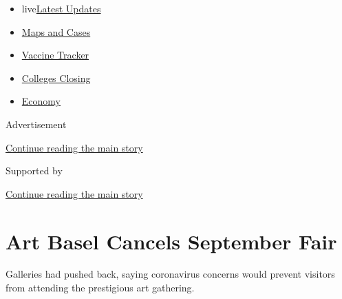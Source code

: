 \begin{itemize}
\tightlist
\item
  live\href{https://www.nytimes3xbfgragh.onion/2020/08/20/world/coronavirus-covid.html?name=styln-coronavirus-national\&region=TOP_BANNER\&variant=undefined\&block=storyline_menu_recirc\&action=click\&pgtype=Article\&impression_id=d84450a1-e386-11ea-ba8c-a97e9a30926c}{Latest
  Updates}
\item
  \href{https://www.nytimes3xbfgragh.onion/interactive/2020/us/coronavirus-us-cases.html?name=styln-coronavirus-national\&region=TOP_BANNER\&variant=undefined\&block=storyline_menu_recirc\&action=click\&pgtype=Article\&impression_id=d84450a2-e386-11ea-ba8c-a97e9a30926c}{Maps
  and Cases}
\item
  \href{https://www.nytimes3xbfgragh.onion/interactive/2020/science/coronavirus-vaccine-tracker.html?name=styln-coronavirus-national\&region=TOP_BANNER\&variant=undefined\&block=storyline_menu_recirc\&action=click\&pgtype=Article\&impression_id=d84450a3-e386-11ea-ba8c-a97e9a30926c}{Vaccine
  Tracker}
\item
  \href{https://www.nytimes3xbfgragh.onion/2020/08/19/us/colleges-closing-covid.html?name=styln-coronavirus-national\&region=TOP_BANNER\&variant=undefined\&block=storyline_menu_recirc\&action=click\&pgtype=Article\&impression_id=d84450a4-e386-11ea-ba8c-a97e9a30926c}{Colleges
  Closing}
\item
  \href{https://www.nytimes3xbfgragh.onion/live/2020/08/20/business/stock-market-today-coronavirus?name=styln-coronavirus-national\&region=TOP_BANNER\&variant=undefined\&block=storyline_menu_recirc\&action=click\&pgtype=Article\&impression_id=d84477b0-e386-11ea-ba8c-a97e9a30926c}{Economy}
\end{itemize}

Advertisement

\protect\hyperlink{after-top}{Continue reading the main story}

Supported by

\protect\hyperlink{after-sponsor}{Continue reading the main story}

\hypertarget{art-basel-cancels-september-fair}{%
\section{Art Basel Cancels September
Fair}\label{art-basel-cancels-september-fair}}

Galleries had pushed back, saying coronavirus concerns would prevent
visitors from attending the prestigious art gathering.

